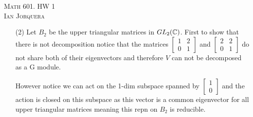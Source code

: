 \documentclass[12pt]{amsart}
\begin{document}
\begin{center}
    \textsc{Math 601. HW 1\\ Ian Jorquera}
\end{center}
\vspace{1em}
\begin{itemize}
%           
%

\item[(2)] %
           Let $B_2$ be the upper triangular matrices in $GL_2(\mathbb{C})$. First to show that there is not decomposition 
           notice that the matrices $\begin{bmatrix}1 & 2\\ 0 & 1\end{bmatrix}$ and 
           $\begin{bmatrix}2 & 2\\ 0 & 1\end{bmatrix}$ do not share both of their eigenvectors and therefore 
           $V$ can not be decomposed as a G module. 
           
           However notice we can act on the 1-dim subspace spanned by $\begin{bmatrix}1\\ 0 \end{bmatrix}$ 
           and the action is closed on this subspace as this vector is a common eigenvector for all upper triangular matrices
           meaning this repn on 
           $B_2$ is reducible.


\end{itemize}
\end{document}
